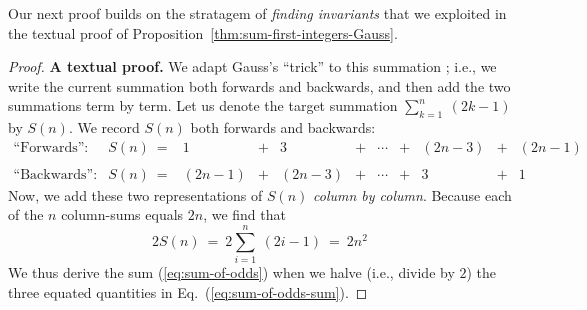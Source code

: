 \medskip

Our next proof builds on the stratagem of {\em finding invariants} that we exploited in the textual proof of Proposition~\ref{thm:sum-first-integers-Gauss}.

\begin{proof}
{\bf A textual proof.}
We adapt Gauss's ``trick'' to this summation ; i.e., we write the current summation both forwards and backwards, and then add the two summations term by term.  Let us denote the target summation $\sum_{k=1}^n \ (2k-1)$ by $S(n)$.  We record $S(n)$ both forwards and backwards:
\begin{equation}
\label{eq:add-odds}
\begin{array}{llccccccccc}
\mbox{``Forwards'':} &
S(n) \ = 
& 1 & + & 3 & + & \cdots & + & (2n-3) & + & (2n-1) \\
 & & & & & & & & & &  \\
\mbox{``Backwards'':} &
S(n) \ =
& (2n-1) & + & (2n-3) & + & \cdots & + & 3 & + & 1
\end{array}
\end{equation}
Now, we add these two representations of $S(n)$ {\em column by column}.  Because each of the $n$ column-sums equals $2n$, we find that
\begin{equation}
\label{eq:sum-of-odds-sum}
2 S(n) \ = \ 2 \sum_{i=1}^n \ (2i-1) \ = \ 2n^2
\end{equation}
We thus derive the sum (\ref{eq:sum-of-odds}) when we halve (i.e., divide by $2$) the three
equated quantities in Eq.~(\ref{eq:sum-of-odds-sum}).
\end{proof}

\medskip


